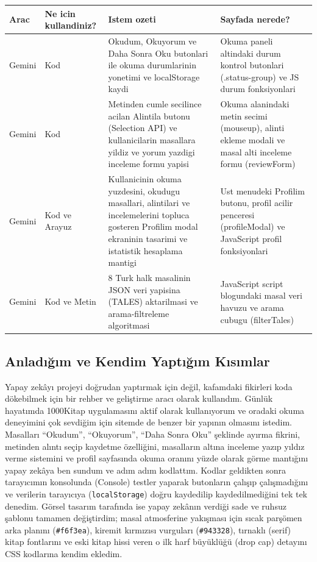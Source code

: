\documentclass[12pt,a4paper]{article}
\begin{document}
\begin{longtable}{@{}p{1.8cm}p{2.2cm}p{5.5cm}p{4.5cm}@{}}
\toprule
\textbf{Arac} & \textbf{Ne icin kullandiniz?} & \textbf{Istem ozeti} & \textbf{Sayfada nerede?} \\
\midrule
\endhead

Gemini & Kod & Okudum, Okuyorum ve Daha Sonra Oku butonlari ile okuma durumlarinin yonetimi ve localStorage kaydi & Okuma paneli altindaki durum kontrol butonlari (.status-group) ve JS durum fonksiyonlari \\
\midrule
Gemini & Kod & Metinden cumle secilince acilan Alintila butonu (Selection API) ve kullanicilarin masallara yildiz ve yorum yazdigi inceleme formu yapisi & Okuma alanindaki metin secimi (mouseup), alinti ekleme modali ve masal alti inceleme formu (reviewForm) \\
\midrule
Gemini & Kod ve Arayuz & Kullanicinin okuma yuzdesini, okudugu masallari, alintilari ve incelemelerini topluca gosteren Profilim modal ekraninin tasarimi ve istatistik hesaplama mantigi & Ust menudeki Profilim butonu, profil acilir penceresi (profileModal) ve JavaScript profil fonksiyonlari \\
\midrule
Gemini & Kod ve Metin & 8 Turk halk masalinin JSON veri yapisina (TALES) aktarilmasi ve arama-filtreleme algoritmasi & JavaScript script blogundaki masal veri havuzu ve arama cubugu (filterTales) \\
\bottomrule
\end{longtable}

\subsection{Anladığım ve Kendim Yaptığım Kısımlar}
Yapay zekâyı projeyi doğrudan yaptırmak için değil, kafamdaki fikirleri koda dökebilmek için bir rehber ve geliştirme aracı olarak kullandım. Günlük hayatımda 1000Kitap uygulamasını aktif olarak kullanıyorum ve oradaki okuma deneyimini çok sevdiğim için sitemde de benzer bir yapının olmasını istedim. Masalları ``Okudum'', ``Okuyorum'', ``Daha Sonra Oku'' şeklinde ayırma fikrini, metinden alıntı seçip kaydetme özelliğini, masalların altına inceleme yazıp yıldız verme sistemini ve profil sayfasında okuma oranını yüzde olarak görme mantığını yapay zekâya ben sundum ve adım adım kodlattım. Kodlar geldikten sonra tarayıcımın konsolunda (Console) testler yaparak butonların çalışıp çalışmadığını ve verilerin tarayıcıya (\texttt{localStorage}) doğru kaydedilip kaydedilmediğini tek tek denedim. Görsel tasarım tarafında ise yapay zekânın verdiği sade ve ruhsuz şablonu tamamen değiştirdim; masal atmosferine yakışması için sıcak parşömen arka planını (\texttt{\#f6f3ea}), kiremit kırmızısı vurguları (\texttt{\#943328}), tırnaklı (serif) kitap fontlarını ve eski kitap hissi veren o ilk harf büyüklüğü (drop cap) detayını CSS kodlarına kendim ekledim.
\end{document}
